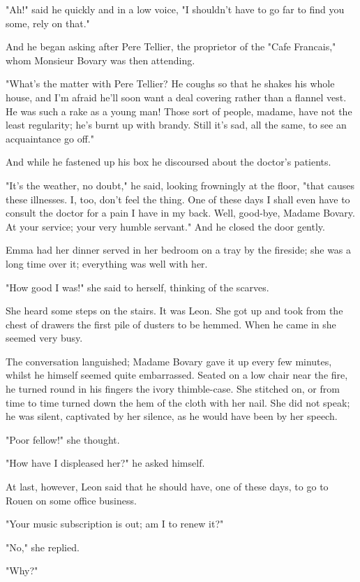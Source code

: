 \documentclass{tufte-book}
\begin{document}
"Ah!" said he quickly and in a low voice, "I shouldn't have to go far to
find you some, rely on that."

And he began asking after Pere Tellier, the proprietor of the "Cafe
Francais," whom Monsieur Bovary was then attending.

"What's the matter with Pere Tellier? He coughs so that he shakes his
whole house, and I'm afraid he'll soon want a deal covering rather than
a flannel vest. He was such a rake as a young man! Those sort of people,
madame, have not the least regularity; he's burnt up with brandy. Still
it's sad, all the same, to see an acquaintance go off."

And while he fastened up his box he discoursed about the doctor's
patients.

"It's the weather, no doubt," he said, looking frowningly at the floor,
"that causes these illnesses. I, too, don't feel the thing. One of these
days I shall even have to consult the doctor for a pain I have in my
back. Well, good-bye, Madame Bovary. At your service; your very humble
servant." And he closed the door gently.

Emma had her dinner served in her bedroom on a tray by the fireside; she
was a long time over it; everything was well with her.

"How good I was!" she said to herself, thinking of the scarves.

She heard some steps on the stairs. It was Leon. She got up and took
from the chest of drawers the first pile of dusters to be hemmed. When
he came in she seemed very busy.

The conversation languished; Madame Bovary gave it up every few minutes,
whilst he himself seemed quite embarrassed. Seated on a low chair near
the fire, he turned round in his fingers the ivory thimble-case. She
stitched on, or from time to time turned down the hem of the cloth with
her nail. She did not speak; he was silent, captivated by her silence,
as he would have been by her speech.

"Poor fellow!" she thought.

"How have I displeased her?" he asked himself.

At last, however, Leon said that he should have, one of these days, to
go to Rouen on some office business.

"Your music subscription is out; am I to renew it?"

"No," she replied.

"Why?"
\end{document}
